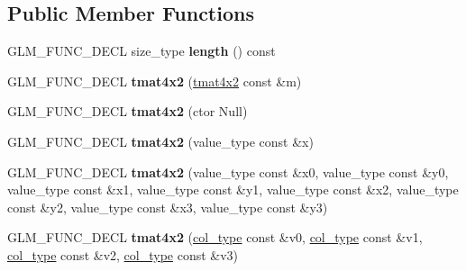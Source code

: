 \subsection*{\-Public \-Member \-Functions}
\begin{DoxyCompactItemize}
\item 
\hypertarget{structglm_1_1detail_1_1tmat4x2_a33bb2939ee432a46bc0eb948f16c54cb}{\-G\-L\-M\-\_\-\-F\-U\-N\-C\-\_\-\-D\-E\-C\-L size\-\_\-type {\bfseries length} () const }\label{structglm_1_1detail_1_1tmat4x2_a33bb2939ee432a46bc0eb948f16c54cb}

\item 
\hypertarget{structglm_1_1detail_1_1tmat4x2_a21673f91cd632a43d412702336f2b982}{\-G\-L\-M\-\_\-\-F\-U\-N\-C\-\_\-\-D\-E\-C\-L {\bfseries tmat4x2} (\hyperlink{structglm_1_1detail_1_1tmat4x2}{tmat4x2} const \&m)}\label{structglm_1_1detail_1_1tmat4x2_a21673f91cd632a43d412702336f2b982}

\item 
\hypertarget{structglm_1_1detail_1_1tmat4x2_a66c897d620eda8ceed552aecd16dde84}{\-G\-L\-M\-\_\-\-F\-U\-N\-C\-\_\-\-D\-E\-C\-L {\bfseries tmat4x2} (ctor \-Null)}\label{structglm_1_1detail_1_1tmat4x2_a66c897d620eda8ceed552aecd16dde84}

\item 
\hypertarget{structglm_1_1detail_1_1tmat4x2_afc3d841b8ed8a9071021990b418de881}{\-G\-L\-M\-\_\-\-F\-U\-N\-C\-\_\-\-D\-E\-C\-L {\bfseries tmat4x2} (value\-\_\-type const \&x)}\label{structglm_1_1detail_1_1tmat4x2_afc3d841b8ed8a9071021990b418de881}

\item 
\hypertarget{structglm_1_1detail_1_1tmat4x2_ae052381f88eadec6c0a28c42dba21871}{\-G\-L\-M\-\_\-\-F\-U\-N\-C\-\_\-\-D\-E\-C\-L {\bfseries tmat4x2} (value\-\_\-type const \&x0, value\-\_\-type const \&y0, value\-\_\-type const \&x1, value\-\_\-type const \&y1, value\-\_\-type const \&x2, value\-\_\-type const \&y2, value\-\_\-type const \&x3, value\-\_\-type const \&y3)}\label{structglm_1_1detail_1_1tmat4x2_ae052381f88eadec6c0a28c42dba21871}

\item 
\hypertarget{structglm_1_1detail_1_1tmat4x2_a31d767bc971c9378a1deff8f62dd6575}{\-G\-L\-M\-\_\-\-F\-U\-N\-C\-\_\-\-D\-E\-C\-L {\bfseries tmat4x2} (\hyperlink{structglm_1_1detail_1_1tvec2}{col\-\_\-type} const \&v0, \hyperlink{structglm_1_1detail_1_1tvec2}{col\-\_\-type} const \&v1, \hyperlink{structglm_1_1detail_1_1tvec2}{col\-\_\-type} const \&v2, \hyperlink{structglm_1_1detail_1_1tvec2}{col\-\_\-type} const \&v3)}\label{structglm_1_1detail_1_1tmat4x2_a31d767bc971c9378a1deff8f62dd6575}


\end{DoxyCompactItemize}
